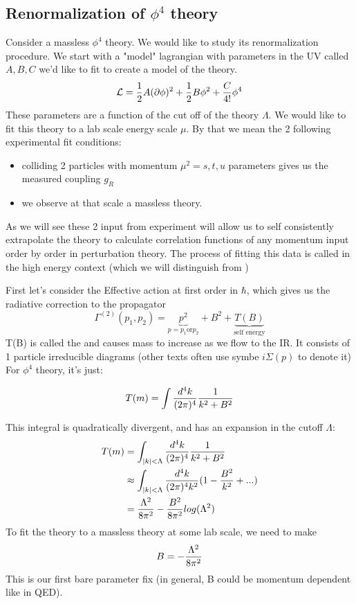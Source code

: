 \documentclass[11pt]{scrartcl}
\begin{document}
\subsection{Renormalization of $\phi^4$ theory}
Consider a massless $\phi^4$ theory.  We would like to study its renormalization procedure.  We start with a "model" lagrangian with parameters in the UV called  $A, B, C$ we'd like to fit to create a model of the theory.
\begin{align}
\mathcal{L} = \frac{1}{2} A (\partial \phi)^2 + \frac{1}{2} B \phi^2 + {C \over 4!} \phi^4
\end{align}
These parameters are a function of the cut off of the theory $\Lambda$.  We would like to fit this theory to a lab scale energy scale $\mu$.
By that we mean the 2 following experimental fit conditions:
\begin{itemize}
\item colliding 2 particles with momentum $\mu^2 = s, t, u$  parameters gives us the measured
coupling $g_R$
\item we observe at that scale a massless theory.
\end{itemize}
As we will see these 2 input from experiment will allow us to self consistently extrapolate the theory to calculate correlation functions of any momentum input order by order in perturbation theory.  The process of fitting this data is called  in the high energy context (which we will
distinguish from )


First let's consider the Effective action at first order in $\hbar$, which gives us the radiative correction to the propagator $$\Gamma^{(2)}(p_1, p_2) = \underbrace{p^2}_{p = p_1 \text{or} p_2} + B^2 + \underbrace{T(B)}_{\text{self energy}}$$
T(B) is called the  and causes mass to increase as we flow to the IR.
It  consists of 1 particle irreducible diagrams (other texts often use symbe $i \Sigma(p)$ to denote it)
For $\phi^4$ theory, it's just:

$$T(m) = \int {d^4 k \over (2 \pi)^4} {1 \over k^2 + B^2}$$

This integral is quadratically divergent, and has an expansion in the cutoff $\Lambda$:
\begin{align}
T(m) & =  \int_{|k| < \Lambda} {d^4 k \over (2 \pi)^4} {1 \over k^2 + B^2} \\
& \approx  \int_{|k| < \Lambda} {d^4 k \over (2 \pi)^4 k^2} (1 - {B^2 \over k^2} + ...) \\
& = {\Lambda^2 \over 8 \pi^2} - {B^2 \over 8 \pi^2} log(\Lambda^2)
\end{align}
To fit the theory to a massless theory at some lab scale, we need to make
$$B = -{\Lambda^2 \over 8 \pi^2}$$
This is our first bare parameter fix (in general, B could be momentum dependent like in QED).
\end{document}
